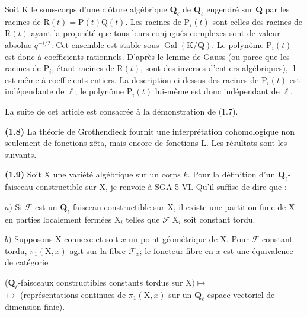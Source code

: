 \documentclass[10pt,leqno]{article}
\begin{document}
\noindent Soit \(\mathrm{K}\) le sous-corps d’une clôture algébrique \(\overline{\mathbf{Q}}_{\ell }\) de \(\mathbf{Q}_{\ell }\) engendré sur \(\mathbf{Q}\) par les racines de \(\mathrm{R}(t)=\mathrm{P}(t)\mathrm{Q}(t)\). Les racines de \(\mathrm{P}_{i}(t)\) sont celles des racines de \(\mathrm{R}(t)\) ayant la propriété que tous leurs conjugués complexes sont de valeur absolue \(q^{- i/2}\). Cet ensemble est stable sous \(\operatorname{Gal}(\mathrm{K}/\mathbf{Q})\). Le polynôme \(\mathrm{P}_{i}(t)\) est donc à coefficients rationnels. D’après le lemme de Gauss (ou parce que les racines de \(\mathrm{P}_{i}\), étant racines de \(\mathrm{R}(t)\), sont des inverses d’entiers algébriques), il est même à coefficients entiers. La description ci-dessus des racines de \(\mathrm{P}_{i}(t)\) est indépendante de \(\ell \); le polynôme \(\mathrm{P}_{i}(t)\) lui-même est donc indépendant de \(\ell \).\par

\noindent La suite de cet article est consacrée à la démonstration de (1.7).\par

\noindent \textbf{(1.8)} La théorie de Grothendieck fournit une interprétation cohomologique non seulement de fonctions zêta, mais encore de fonctions \(\mathrm{L}\). Les résultats sont les suivants.\par

\noindent \textbf{(1.9)} Soit \(\mathrm{X}\) une variété algébrique sur un corps \(k\). Pour la définition d’un \(\mathbf{Q}_{\ell }\)-faisceau constructible sur \(\mathrm{X}\), je renvoie à SGA 5 VI. Qu’il suffise de dire que :\par

\noindent \(a)\) Si \(\mathcal{F} \) est un \(\mathbf{Q}_{\ell }\)-faisceau constructible sur \(\mathrm{X}\), il existe une partition finie de \(\mathrm{X}\) en parties localement fermées \(\mathrm{X}_{i}\) telles que \(\mathcal{F} |\mathrm{X}_{i}\) soit constant tordu.\par

\noindent \(b)\) Supposons \(\mathrm{X}\) connexe et soit \(\overline{x}\) un point géométrique de \(\mathrm{X}\). Pour \(\mathcal{F} \) constant tordu, \(\pi _{1}(\mathrm{X},\overline{x})\) agit sur la fibre \(\mathcal{F} _{\overline{x}}\); le foncteur fibre en \(\overline{x}\) est une équivalence de catégorie\par

\begin{center}(\(\mathbf{Q}_{\ell }\)-faisceaux constructibles constants tordus sur \(\mathrm{X}) \longmapsto \)\\ \(\longmapsto \) (représentations continues de \(\pi _{1}(\mathrm{X},\overline{x})\) sur un \(\mathbf{Q}_{\ell }\)-espace vectoriel de dimension finie).\end{center}
\end{document}
